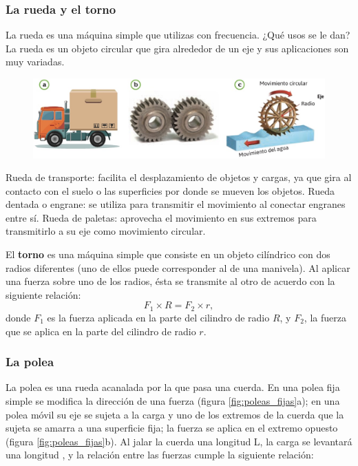 \documentclass[11pt]{book}
\begin{document}
\newpage

\subsubsection{La rueda y el torno}

La rueda es una máquina simple que utilizas con frecuencia.
¿Qué usos se le dan? La rueda es un objeto circular que gira alrededor de un
eje y sus aplicaciones son muy variadas.\\

\begin{figure}[H]
    \centering
    \includegraphics[width=0.9\linewidth]{ruedas01.jpg}
    \label{fig:ruedas01}
\end{figure}

Rueda de transporte: facilita el desplazamiento de objetos y cargas,
ya que gira al contacto con el suelo o las superficies por donde se
mueven los objetos.
Rueda dentada o engrane: se utiliza para transmitir
el movimiento al conectar engranes entre sí.
Rueda de paletas: aprovecha el movimiento en sus extremos para transmitirlo
a su eje como movimiento circular.

El \textbf{torno} es una máquina simple que consiste en un objeto cilíndrico
con dos radios diferentes (uno de ellos puede corresponder al de una manivela).
Al aplicar una fuerza sobre uno de los radios, ésta se transmite al otro de acuerdo
con la siguiente relación:\\

\begin{equation}
    F_1 \times R= F_2 \times r,
\end{equation}
donde $F_1$ es la fuerza aplicada en la parte del cilindro de radio $R$, y $F_2$,
la fuerza que se aplica en la parte del cilindro de radio $r$.

\newpage
\subsubsection{La polea}
La polea es una rueda acanalada por la que pasa una cuerda. En una polea fija simple
se modifica la dirección de una fuerza (figura \ref{fig:poleas_fijas}a); en una polea móvil su eje se
sujeta a la carga y uno de los extremos de la cuerda que la sujeta se amarra a una
superficie fija; la fuerza se aplica en el extremo opuesto (figura \ref{fig:poleas_fijas}b).
Al jalar la cuerda una longitud L, la carga se levantará una longitud ,
y la relación entre las fuerzas cumple la siguiente relación:
\end{document}
